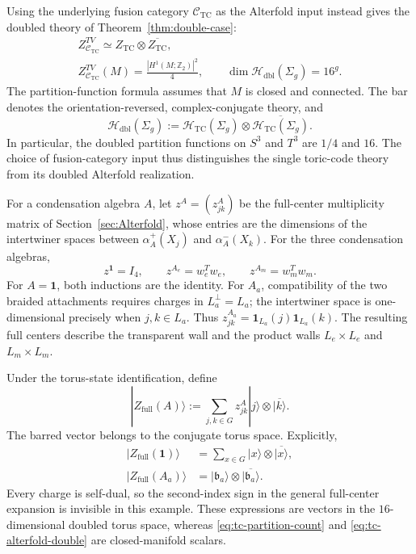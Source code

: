 \documentclass[12pt]{amsart}
\numberwithin{equation}{section}
\theoremstyle{definition}
\begin{document}
Using the underlying fusion category
$\mathcal C_{\mathrm{TC}}$ as the Alterfold input instead gives
the doubled theory of Theorem~\ref{thm:double-case}:
\begin{equation}
\label{eq:tc-alterfold-double}
\begin{gathered}
Z^{TV}_{\mathcal C_{\mathrm{TC}}}
\simeq
Z_{\mathrm{TC}}\otimes\overline{Z_{\mathrm{TC}}},
\\
Z^{TV}_{\mathcal C_{\mathrm{TC}}}(M)
=
\frac{|H^1(M;\mathbb Z_2)|^2}{4},
\qquad
\dim\mathcal H_{\mathrm{dbl}}(\Sigma_g)=16^g.
\end{gathered}
\end{equation}
The partition-function formula assumes that $M$ is closed and
connected. The bar denotes the orientation-reversed,
complex-conjugate theory, and
$$
\mathcal H_{\mathrm{dbl}}(\Sigma_g)
:=
\mathcal H_{\mathrm{TC}}(\Sigma_g)
\otimes
\overline{\mathcal H_{\mathrm{TC}}(\Sigma_g)}.
$$
In particular, the doubled partition functions on $S^3$ and $T^3$
are $1/4$ and $16$. The choice of fusion-category input thus
distinguishes the single toric-code theory from its doubled
Alterfold realization.

For a condensation algebra $A$, let $z^A=(z^A_{jk})$ be the
full-center multiplicity matrix of Section~\ref{sec:Alterfold},
whose entries are the dimensions of the intertwiner spaces
between $\alpha_A^+(X_j)$ and $\alpha_A^-(X_k)$.
For the three condensation algebras,
\begin{equation}
\label{eq:tc-full-centers}
z^{\mathbf1}=I_4,
\qquad
z^{A_e}=w_e^T w_e,
\qquad
z^{A_m}=w_m^T w_m.
\end{equation}
For $A=\mathbf1$, both inductions are the identity.
For $A_a$, compatibility of the two braided attachments requires
charges in $L_a^\perp=L_a$; the intertwiner space is
one-dimensional precisely when $j,k\in L_a$.
Thus
$z^{A_a}_{jk}=\mathbf1_{L_a}(j)\mathbf1_{L_a}(k)$.
The resulting full centers describe the transparent wall and
the product walls $L_e\times L_e$ and $L_m\times L_m$.

Under the torus-state identification, define
$$
|Z_{\mathrm{full}}(A)\rangle
:=
\sum_{j,k\in G}
z^A_{jk}|j\rangle\otimes\overline{|k\rangle}.
$$
The barred vector belongs to the conjugate torus space.
Explicitly,
\begin{equation}
\label{eq:tc-doubled-torus-states}
\begin{aligned}
|Z_{\mathrm{full}}(\mathbf1)\rangle
&=
\sum_{x\in G}|x\rangle\otimes\overline{|x\rangle},
\\
|Z_{\mathrm{full}}(A_a)\rangle
&=
|\mathfrak b_a\rangle
\otimes\overline{|\mathfrak b_a\rangle}.
\end{aligned}
\end{equation}
Every charge is self-dual, so the second-index sign in the general
full-center expansion is invisible in this example.
These expressions are vectors in the $16$-dimensional doubled
torus space, whereas \eqref{eq:tc-partition-count} and
\eqref{eq:tc-alterfold-double} are closed-manifold scalars.
\end{document}
